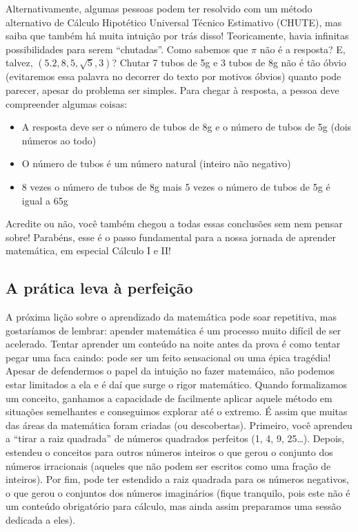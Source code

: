 \documentclass[
  letterpaper,
  DIV=11,
  numbers=noendperiod]{scrreprt}
\providecommand{\tightlist}{%
  \setlength{\itemsep}{0pt}\setlength{\parskip}{0pt}}\usepackage{longtable,booktabs,array}
\begin{document}
Alternativamente, algumas pessoas podem ter resolvido com um método
alternativo de Cálculo Hipotético Universal Técnico Estimativo (CHUTE),
mas saiba que também há muita intuição por trás disso! Teoricamente,
havia infinitas possibilidades para serem ``chutadas''. Como sabemos que
\(\pi\) não é a resposta? E, talvez, \((5.2, 8, 5, \sqrt{5}, 3)\)?
Chutar 7 tubos de 5g e 3 tubos de 8g não é tão óbvio (evitaremos essa
palavra no decorrer do texto por motivos óbvios) quanto pode parecer,
apesar do problema ser simples. Para chegar à resposta, a pessoa deve
compreender algumas coisas:

\begin{itemize}
\tightlist
\item
  A resposta deve ser o número de tubos de 8g e o número de tubos de 5g
  (dois números ao todo)
\item
  O número de tubos é um número natural (inteiro não negativo)
\item
  8 vezes o número de tubos de 8g mais 5 vezes o número de tubos de 5g é
  igual a 65g
\end{itemize}

Acredite ou não, você também chegou a todas essas conclusões sem nem
pensar sobre! Parabéns, esse é o passo fundamental para a nossa jornada
de aprender matemática, em especial Cálculo I e II!

\subsection{A prática leva à
perfeição}\label{a-pruxe1tica-leva-uxe0-perfeiuxe7uxe3o}

A próxima lição sobre o aprendizado da matemática pode soar repetitiva,
mas gostaríamos de lembrar: apender matemática é um processo muito
difícil de ser acelerado. Tentar aprender um conteúdo na noite antes da
prova é como tentar pegar uma faca caindo: pode ser um feito sensacional
ou uma épica tragédia! Apesar de defendermos o papel da intuição no
fazer matemáico, não podemos estar limitados a ela e é daí que surge o
rigor matemático. Quando formalizamos um conceito, ganhamos a capacidade
de facilmente aplicar aquele método em situações semelhantes e
conseguimos explorar até o extremo. É assim que muitas das áreas da
matemática foram criadas (ou descobertas). Primeiro, você aprendeu a
``tirar a raiz quadrada'' de números quadrados perfeitos (1, 4, 9,
25\ldots). Depois, estendeu o conceitos para outros números inteiros o
que gerou o conjunto dos números irracionais (aqueles que não podem ser
escritos como uma fração de inteiros). Por fim, pode ter estendido a
raiz quadrada para os números negativos, o que gerou o conjuntos dos
números imaginários (fique tranquilo, pois este não é um conteúdo
obrigatório para cálculo, mas ainda assim preparamos uma sessão dedicada
a eles).
\end{document}
